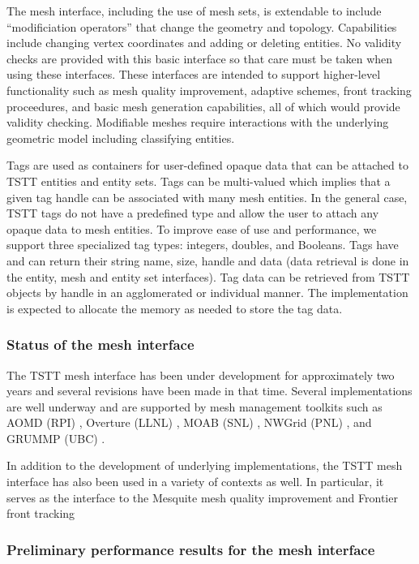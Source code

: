The mesh interface, including the use of mesh sets, is extendable to
include ``modificiation operators'' that change the geometry and topology.
Capabilities include changing
vertex coordinates and adding or deleting entities. No validity checks
are provided with this basic interface so that care must be taken when
using these interfaces.  These interfaces are intended to support
higher-level functionality such as mesh quality improvement, adaptive
schemes, front tracking proceedures, and basic mesh generation
capabilities, all of which would provide validity checking.
Modifiable meshes require interactions with the underlying
geometric model including classifying entities.%

Tags are used as containers for user-defined opaque data that can be
attached to TSTT entities and entity sets.  Tags can be
multi-valued which implies that a given tag handle can be associated
with many mesh entities.  In the general case, TSTT tags do not have a
predefined type and allow the user to attach any opaque data to mesh
entities.  To improve ease of use and performance, we support three
specialized tag types: integers, doubles, and Booleans.  Tags have and
can return their string name, size, handle and data (data retrieval is
done in the entity, mesh and entity set interfaces).  Tag data can be
retrieved from TSTT objects by handle in an agglomerated or individual
manner.  The implementation is expected to allocate the memory as
needed to store the tag data.

\subsubsection{Status of the mesh interface}

The TSTT mesh interface has been under development for approximately
two years and several revisions have been made in that time.  Several
implementations are well underway and are supported by mesh management
toolkits such as AOMD (RPI) \cite{ReSh03}, Overture (LLNL)
\cite{overture}, MOAB (SNL) \cite{moab}, NWGrid (PNL) \cite{nwgrid},
and GRUMMP (UBC) \cite{grummp}.  

In addition to the development of underlying implementations, the
TSTT mesh interface has also been used in a variety of contexts as
well.  In particular, it serves as the interface to the Mesquite 
mesh quality improvement and Frontier front tracking


\subsubsection{Preliminary performance results for the mesh interface}





